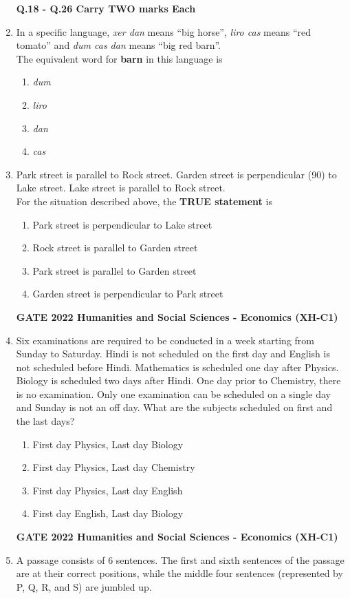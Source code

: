 \documentclass[journal,12pt,onecolumn]{exam}
\theoremstyle{remark}
\begin{document}
\begin{enumerate}
\textbf{Q.18 - Q.26 Carry TWO marks Each}
\item In a specific language, \textit{xer dan} means ``big horse'', \textit{liro cas} means ``red tomato'' and \textit{dum cas dan} means ``big red barn''. \\

  The equivalent word for \textbf{barn} in this language is \
  
  \begin{enumerate}
    \item \textit{dum}
    \item \textit{liro}
    \item \textit{dan}
    \item \textit{cas}
  \end{enumerate}
  
  \item Park street is parallel to Rock street. Garden street is perpendicular (90\degree) to Lake street. Lake street is parallel to Rock street. \\
  
  For the situation described above, the \textbf{TRUE statement} is \

  \begin{enumerate}
    \item Park street is perpendicular to Lake street
    \item Rock street is parallel to Garden street
    \item Park street is parallel to Garden street
    \item Garden street is perpendicular to Park street
  \end{enumerate}
\textbf{GATE 2022 Humanities and Social Sciences - Economics (XH-C1)}
 \item Six examinations are required to be conducted in a week starting from Sunday to Saturday. Hindi is not scheduled on the first day and English is not scheduled before Hindi. Mathematics is scheduled one day after Physics. Biology is scheduled two days after Hindi. One day prior to Chemistry, there is no examination. Only one examination can be scheduled on a single day and Sunday is not an off day. What are the subjects scheduled on first and the last days? \\
  
 
  \begin{enumerate}
    \item First day Physics, Last day Biology
    \item First day Physics, Last day Chemistry
    \item First day Physics, Last day English
    \item First day English, Last day Biology
  \end{enumerate}
  \newpage
  \textbf{GATE 2022 Humanities and Social Sciences - Economics (XH-C1)}
   \item A passage consists of 6 sentences. The first and sixth sentences of the passage are at their correct positions, while the middle four sentences (represented by P, Q, R, and S) are jumbled up.


\end{enumerate}
\end{document}
